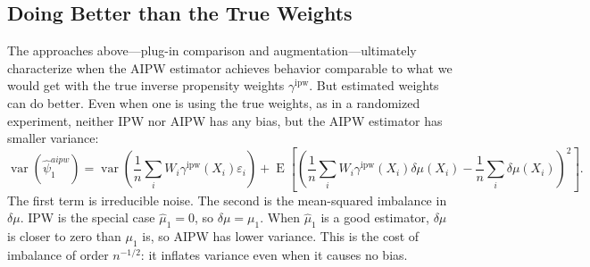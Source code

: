 \documentclass{article}
\theoremstyle{definition}
\newcommand{\calF}{\ensuremath{\mathcal{F}}}
\DeclareMathOperator{\E}{E}
\newcommand{\calM}{\ensuremath{\mathcal{M}}}
\DeclareMathOperator{\Var}{var}
\newcommand{\ipw}{\text{ipw}}
\newcommand{\dm}{\delta \mu}
\DeclareMathOperator{\imbalance}{imbalance}
\newcommand{\gammaipw}{\ensuremath{\gamma^{\ipw}}}
\newcommand{\<}{\langle}
\renewcommand{\>}{\rangle}
\begin{document}


\subsection{Doing Better than the True Weights}%
\label{sec:doing-better}

The approaches above---plug-in comparison and augmentation---ultimately characterize when the AIPW estimator achieves behavior comparable to what we would get with the true inverse propensity weights $\gammaipw$. But estimated weights can do better. Even when one is using the true weights, as in a randomized experiment, neither IPW nor AIPW has any bias, but the AIPW estimator has smaller variance:
\begin{equation}
\label{eq:aipw-variance-true-weights}
\Var\!\left(\hat\psi_1^{aipw}\right) = \Var\!\left(\frac{1}{n}\sum_i W_i \gammaipw(X_i) \varepsilon_i\right) + \E\left[\left(\frac{1}{n}\sum_i W_i \gammaipw(X_i) \dm(X_i) - \frac{1}{n}\sum_i \dm(X_i)\right)^{\!2}\right].
\end{equation}
The first term is irreducible noise. The second is the mean-squared imbalance in $\dm$. IPW is the special case $\hat \mu_1 = 0$, so $\dm = \mu_1$. When $\hat \mu_1$ is a good estimator, $\dm$ is closer to zero than $\mu_1$ is, so AIPW has lower variance. This is the cost of imbalance of order $n^{-1/2}$: it inflates variance even when it causes no bias.
\end{document}
